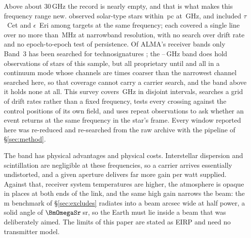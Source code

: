 Above about 30\,GHz the record is nearly empty, and that is what makes this
frequency range new. \citet{Steffes1994} observed \SbPriorNStarA{} solar-type
stars within \SbPriorDistA\,pc at \SbPriorFreqGHz\,GHz, and
\citet{Mauersberger1996} included $\tau$~Cet and $\epsilon$~Eri among
\SbPriorNStarB{} targets at the same frequency; each covered a single line
over no more than \SbPriorBandMHz\,MHz at narrowband resolution, with no
search over drift rate and no epoch-to-epoch test of persistence. Of ALMA's
receiver bands only Band~3 has been searched for technosignatures
\citep{Mason2025}; the \SbBandOneLoGHz--\SbBandOneHiGHz\,GHz band does hold
observations of \SbBoneNStar{} stars of this sample, but all proprietary
until \SbBoneRelYear{} and all in a continuum mode whose channels are
\SbBoneChanRatio{} times coarser than the narrowest channel searched here, so
that coverage cannot carry a carrier search, and the band above it holds none
at all. This survey covers
\DnuA\,GHz in \CovNIslands{} disjoint intervals, searches a grid of drift rates rather
than a fixed frequency, tests every crossing against the \BdNCtrl{} control positions of
its own field, and uses repeat observations to ask whether an event returns
at the same frequency in the star's frame. Every window reported here was
re-reduced and re-searched from the raw archive with the pipeline of
\S\ref{sec:method}.

The band has physical advantages and physical costs. Interstellar dispersion
and scintillation are negligible at these frequencies, so a carrier arrives
essentially undistorted, and a given aperture delivers far more gain per watt
supplied. Against that, receiver system temperatures are higher, the
atmosphere is opaque in places at both ends of the link, and the same high
gain narrows the beam: the \BenchDiam\,m benchmark of
\S\ref{sec:excludes} radiates into a beam \BmArcsec{} arcsec wide at half
power, a solid angle of $\BmOmegaSr$\,sr, so
the Earth must lie inside a beam that was deliberately aimed. The limits of
this paper are stated as EIRP and need no transmitter model.

